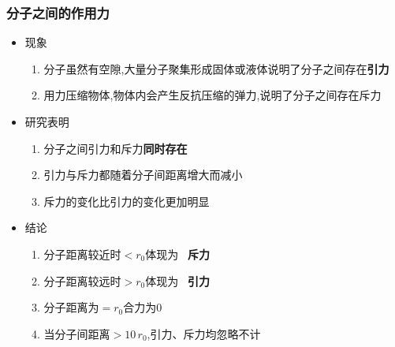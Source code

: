 \documentclass{article}
\begin{document}
\subsubsection{分子之间的作用力}
\begin{itemize}
    \item 现象
          \begin{enumerate}[label = (\arabic*)]
              \item 分子虽然有空隙,大量分子聚集形成固体或液体说明了分子之间存在\textbf{引力}
              \item 用力压缩物体,物体内会产生反抗压缩的弹力,说明了分子之间存在斥力
          \end{enumerate}
    \item 研究表明
          \begin{enumerate}[label = (\arabic*)]
              \item 分子之间引力和斥力\textbf{同时存在}
              \item 引力与斥力都随着分子间距离增大而减小
              \item 斥力的变化比引力的变化更加明显
          \end{enumerate}
    \item 结论
          \begin{enumerate}[label = (\arabic*)]
              \item 分子距离较近时$<r_{0}$体现为 \, \textbf{斥力}
              \item 分子距离较远时$>r_{0}$体现为 \, \textbf{引力}
              \item 分子距离为$=r_{0}$合力为$0$
              \item 当分子间距离$>10 \, r_{0}$,引力、斥力均忽略不计
          \end{enumerate}

\end{itemize}

\vspace{2em}
\end{document}
